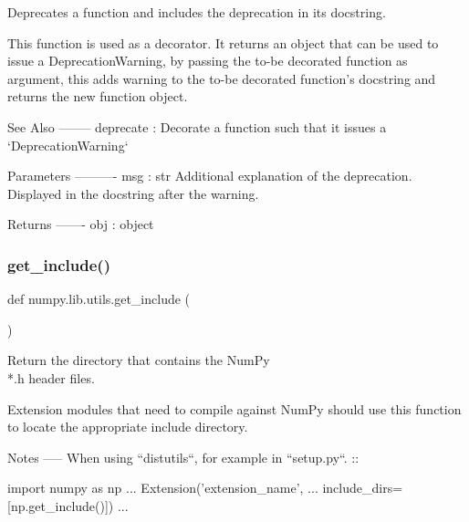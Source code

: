\begin{DoxyVerb}Deprecates a function and includes the deprecation in its docstring.

This function is used as a decorator. It returns an object that can be
used to issue a DeprecationWarning, by passing the to-be decorated
function as argument, this adds warning to the to-be decorated function's
docstring and returns the new function object.

See Also
--------
deprecate : Decorate a function such that it issues a `DeprecationWarning`

Parameters
----------
msg : str
    Additional explanation of the deprecation. Displayed in the
    docstring after the warning.

Returns
-------
obj : object\end{DoxyVerb}
 \mbox{\label{namespacenumpy_1_1lib_1_1utils_af88a4119737ebfe13e2d9b9eb50a09c5}} 
\subsubsection{\texorpdfstring{get\+\_\+include()}{get\_include()}}
{\footnotesize\ttfamily def numpy.\+lib.\+utils.\+get\+\_\+include (\begin{DoxyParamCaption}{ }\end{DoxyParamCaption})}

\begin{DoxyVerb}Return the directory that contains the NumPy \\*.h header files.

Extension modules that need to compile against NumPy should use this
function to locate the appropriate include directory.

Notes
-----
When using ``distutils``, for example in ``setup.py``.
::

    import numpy as np
    ...
    Extension('extension_name', ...
            include_dirs=[np.get_include()])
    ...\end{DoxyVerb}
 \mbox{\label{namespacenumpy_1_1lib_1_1utils_a20bd9fdff36ab4476ff840623e0e62f9}} 
